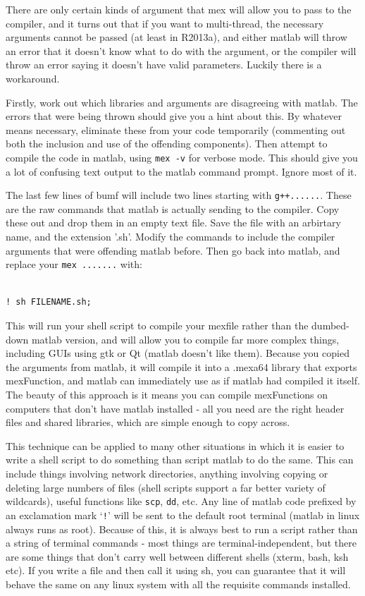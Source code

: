 \documentclass[12pt,a4paper]{article}
\begin{document}
There are only certain kinds of argument that mex will allow you to pass to the compiler, and it turns out that if you want to multi-thread, the necessary arguments cannot be passed (at least in R2013a), and either matlab will throw an error that it doesn't know what to do with the argument, or the compiler will throw an error saying it doesn't have valid parameters. Luckily there is a workaround.

Firstly, work out which libraries and arguments are disagreeing with matlab. The errors that were being thrown should give you a hint about this. By whatever means necessary, eliminate these from your code temporarily (commenting out both the inclusion and use of the offending components). Then attempt to compile the code in matlab, using \texttt{mex -v} for verbose mode. This should give you a lot of confusing text output to the matlab command prompt. Ignore most of it.

The last few lines of bumf will include two lines starting with \texttt{g++......}. These are the raw commands that matlab is actually sending to the compiler. Copy these out and drop them in an empty text file. Save the file with an arbirtary name, and the extension '.sh'. Modify the commands to include the compiler arguments that were offending matlab before. Then go back into matlab, and replace your \texttt{mex .......} with:

\lstset{language=bash}
\begin{lstlisting}

! sh FILENAME.sh;

\end{lstlisting}

This will run your shell script to compile your mexfile rather than the dumbed-down matlab version, and will allow you to compile far more complex things, including GUIs using gtk or Qt (matlab doesn't like them). Because you copied the arguments from matlab, it will compile it into a .mexa64 library that exports mexFunction, and matlab can immediately use as if matlab had compiled it itself. The beauty of this approach is it means you can compile mexFunctions on computers that don't have matlab installed - all you need are the right header files and shared libraries, which are simple enough to copy across.

This technique can be applied to many other situations in which it is easier to write a shell script to do something than script matlab to do the same. This can include things involving network directories, anything involving copying or deleting large numbers of files (shell scripts support a far better variety of wildcards), useful functions like \texttt{scp}, \texttt{dd}, etc. Any line of matlab code prefixed by an exclamation mark `\texttt{!}' will be sent to the default root terminal (matlab in linux always runs as root). Because of this, it is always best to run a script rather than a string of terminal commands - most things are terminal-independent, but there are some things that don't carry well between different shells (xterm, bash, ksh etc). If you write a file and then call it using sh, you can guarantee that it will behave the same on any linux system with all the requisite commands installed.
\end{document}
